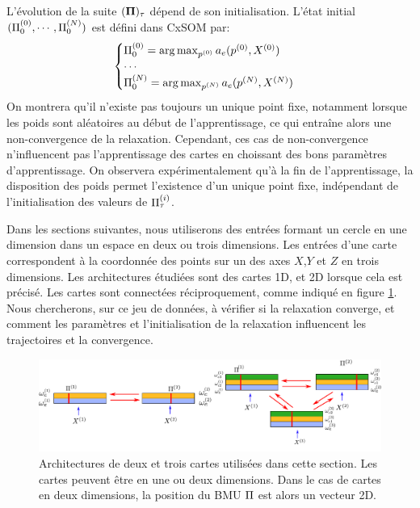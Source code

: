 L'évolution de la suite $(\mathbf{\Pi})_{\tau}$ dépend de son initialisation.
L'état initial $(\Pi^{({0})}_0, \cdots , \Pi^{({N})}_0)$ est défini dans CxSOM par: 
\begin{equation}
\begin{cases}
\Pi^{({0})}_0 = \operatorname*{arg\,max}_{p^{({0})}} a_e(p^{({0})},X^{({0})})\\
\cdots \\
\Pi^{({N})}_0 = \operatorname*{arg\,max}_{p^{({N})}} a_e(p^{({N})},X^{({N})})\\
\end{cases}
\label{eq:init}
\end{equation}
On montrera qu'il n'existe pas toujours un unique point fixe, notamment lorsque les poids sont aléatoires au début de l'apprentissage, ce qui entraîne alors une non-convergence de la relaxation. Cependant, ces cas de non-convergence n'influencent pas l'apprentissage des cartes en choissant des bons paramètres d'apprentissage. On observera expérimentalement qu'à la fin de l'apprentissage, la disposition des poids permet l'existence d'un unique point fixe, indépendant de l'initialisation des valeurs de $\Pi^{({i})}_{\tau}$.

Dans les sections suivantes, nous utiliserons des entrées formant un cercle en une dimension dans un espace en deux ou trois dimensions. Les entrées d'une carte correspondent à la coordonnée des points sur un des axes $X$,$Y$ et $Z$ en trois dimensions.
Les architectures étudiées sont des cartes 1D, et 2D lorsque cela est précisé. Les cartes sont connectées réciproquement, comme indiqué en figure \ref{fig:archis}.
Nous chercherons, sur ce jeu de données, à vérifier si la relaxation converge, et comment les paramètres et l'initialisation de la relaxation influencent les trajectoires et la convergence.
\begin{figure}
\centering
\includegraphics[width=\textwidth]{archis}
\caption{Architectures de deux et trois cartes utilisées dans cette section. Les cartes peuvent être en une ou deux dimensions. Dans le cas de cartes en deux dimensions, la position du BMU $\Pi$ est alors un vecteur 2D.}
\label{fig:archis}
\end{figure}


